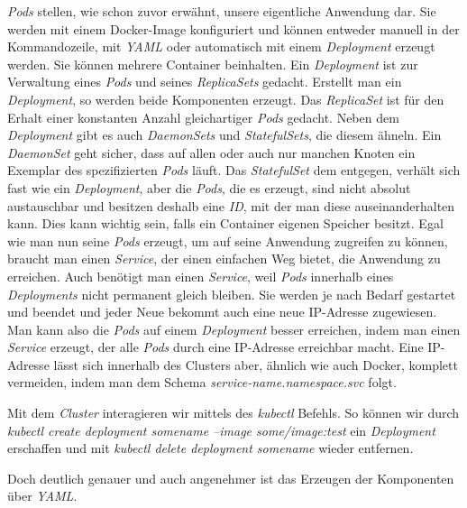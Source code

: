 \documentclass[12pt,a4paper]{scrartcl}
\begin{document}
\emph{Pods} stellen, wie schon zuvor erwähnt, unsere eigentliche Anwendung dar. Sie werden mit einem Docker-Image konfiguriert und können entweder manuell in der Kommandozeile, mit \emph{YAML} oder automatisch mit einem \emph{Deployment} erzeugt werden. Sie können mehrere Container beinhalten.\cite{k8sPod}
Ein \emph{Deployment} ist zur Verwaltung eines \emph{Pods} und seines \emph{ReplicaSets} gedacht. Erstellt man ein \emph{Deployment}, so werden beide Komponenten erzeugt.\cite{k8sDep}
Das \emph{ReplicaSet} ist für den Erhalt einer konstanten Anzahl gleichartiger \emph{Pods} gedacht.\cite{k8sRst}
Neben dem \emph{Deployment} gibt es auch \emph{DaemonSets} und \emph{StatefulSets}, die diesem ähneln. 
Ein \emph{DaemonSet} geht sicher, dass auf allen oder auch nur manchen Knoten ein Exemplar des spezifizierten \emph{Pods} läuft.\cite{k8sDst}
Das \emph{StatefulSet} dem entgegen, verhält sich fast wie ein \emph{Deployment}, aber die \emph{Pods}, die es erzeugt, sind nicht absolut austauschbar und besitzen deshalb eine \emph{ID}, mit der man diese auseinanderhalten kann. Dies kann wichtig sein, falls ein Container eigenen Speicher besitzt.\cite{k8sSst} 
Egal wie man nun seine \emph{Pods} erzeugt, um auf seine Anwendung zugreifen zu können, braucht man einen \emph{Service}, der einen einfachen Weg bietet, die Anwendung zu erreichen. Auch benötigt man einen \emph{Service}, weil \emph{Pods} innerhalb eines \emph{Deployments} nicht permanent gleich bleiben. Sie werden je nach Bedarf gestartet und beendet und jeder Neue bekommt auch eine neue IP-Adresse zugewiesen. Man kann also die \emph{Pods} auf einem \emph{Deployment} besser erreichen, indem man einen \emph{Service} erzeugt, der alle \emph{Pods} durch eine IP-Adresse erreichbar macht. Eine IP-Adresse lässt sich innerhalb des Clusters aber, ähnlich wie auch Docker, komplett vermeiden, indem man dem Schema \emph{service-name.namespace.svc} folgt.\cite{k8sSvc}

Mit dem \emph{Cluster} interagieren wir mittels des \emph{kubectl} Befehls. So können wir durch \emph{kubectl create deployment somename --image some/image:test} ein \emph{Deployment} erschaffen und mit \emph{kubectl delete deployment somename} wieder entfernen. 

Doch deutlich genauer und auch angenehmer ist das Erzeugen der Komponenten über \emph{YAML}. 
\end{document}
